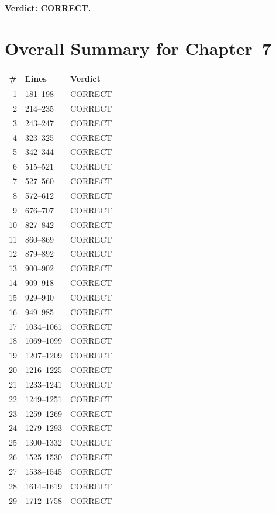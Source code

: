 \documentclass{article}
\begin{document}
\textbf{Verdict: CORRECT.}

\section*{Overall Summary for Chapter~7}

\begin{center}
\begin{tabular}{r|l|l}
\textbf{\#} & \textbf{Lines} & \textbf{Verdict} \\ \hline
1  & 181--198   & CORRECT \\
2  & 214--235   & CORRECT \\
3  & 243--247   & CORRECT \\
4  & 323--325   & CORRECT \\
5  & 342--344   & CORRECT \\
6  & 515--521   & CORRECT \\
7  & 527--560   & CORRECT \\
8  & 572--612   & CORRECT \\
9  & 676--707   & CORRECT \\
10 & 827--842   & CORRECT \\
11 & 860--869   & CORRECT \\
12 & 879--892   & CORRECT \\
13 & 900--902   & CORRECT \\
14 & 909--918   & CORRECT \\
15 & 929--940   & CORRECT \\
16 & 949--985   & CORRECT \\
17 & 1034--1061 & CORRECT \\
18 & 1069--1099 & CORRECT \\
19 & 1207--1209 & CORRECT \\
20 & 1216--1225 & CORRECT \\
21 & 1233--1241 & CORRECT \\
22 & 1249--1251 & CORRECT \\
23 & 1259--1269 & CORRECT \\
24 & 1279--1293 & CORRECT \\
25 & 1300--1332 & CORRECT \\
26 & 1525--1530 & CORRECT \\
27 & 1538--1545 & CORRECT \\
28 & 1614--1619 & CORRECT \\
29 & 1712--1758 & CORRECT \\
\end{tabular}
\end{center}
\end{document}
